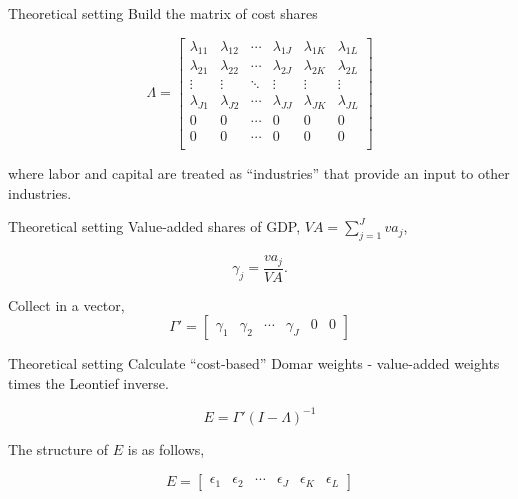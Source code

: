 \documentclass[10pt, xcolor=dvipsnames]{beamer}
\begin{document}
\begin{frame}{Theoretical setting}
Build the matrix of cost shares

\begin{equation}
  \Lambda = 
  \begin{bmatrix}
    \lambda_{11} & \lambda_{12} & \cdots & \lambda_{1J} & \lambda_{1K} & \lambda_{1L} \\
    \lambda_{21} & \lambda_{22} & \cdots & \lambda_{2J} & \lambda_{2K} & \lambda_{2L} \\
    \vdots       & \vdots       & \ddots & \vdots       & \vdots       & \vdots  \\
    \lambda_{J1} & \lambda_{J2} & \cdots & \lambda_{JJ} & \lambda_{JK} & \lambda_{JL} \\
    0 & 0 & \cdots & 0 & 0& 0 \\
    0 & 0 & \cdots & 0 & 0& 0 \\
  \end{bmatrix}
\end{equation}

where labor and capital are treated as ``industries'' that provide an input to other industries.

\end{frame}


\begin{frame}{Theoretical setting}
Value-added shares of GDP, $VA = \sum_{j=1}^J va_j$, 

\begin{equation}
  \gamma_j = \frac{va_j}{VA}.
\end{equation}

Collect in a vector,
\begin{equation}
  \Gamma' = 
  \begin{bmatrix}
    \gamma_1 &
    \gamma_2 &
    \cdots &
    \gamma_J &
    0 &
    0
  \end{bmatrix}
\end{equation}

\end{frame}

\begin{frame}{Theoretical setting}
Calculate ``cost-based'' Domar weights - value-added weights times the Leontief inverse. 

\begin{equation}
  E = \Gamma' (I - \Lambda)^{-1} \label{EQ_E}
\end{equation}

The structure of $E$ is as follows,

\begin{equation}
  E = 
  \begin{bmatrix}
    \epsilon_1 &
    \epsilon_2 &
    \cdots &
    \epsilon_J &
    \epsilon_K &
    \epsilon_L
  \end{bmatrix}
\end{equation}

\end{frame}
\end{document}
